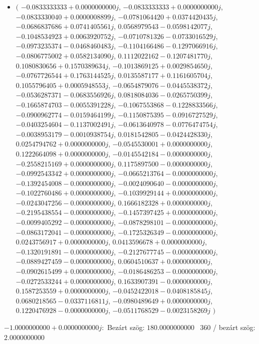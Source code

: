 \documentclass[14pt,a4paper]{article}
\begin{document}
\begin{itemize}
\item
$\big($
$-0.0833333333+0.0000000000j$, $-0.0833333333+0.0000000000j$, $-0.0833330040+0.0000008899j$, $-0.0781064420+0.0374420435j$, $-0.0686837686+0.0741405561j$, $0.0568979543-0.0598142077j$, $-0.1048534923+0.0063920752j$, $-0.0710781326-0.0733016529j$, $-0.0973235374-0.0468460483j$, $-0.1104166486-0.1297066916j$, $-0.0806775002+0.0582134090j$, $0.1112022162-0.1207481770j$, $0.1080830656+0.1570389634j$, $-0.1013869125+0.0029854650j$, $-0.0767726544+0.1763144525j$, $0.0135587177+0.1161605704j$, $0.1055796405+0.0005948553j$, $-0.0654879076-0.0445538372j$, $-0.0536287371-0.0683556926j$, $0.0818084036-0.0265750399j$, $-0.1665874703-0.0055391228j$, $-0.1067553868-0.1228833566j$, $-0.0900962774-0.0159464199j$, $-0.1150875395-0.0916727529j$, $-0.0403254604-0.1137002491j$, $-0.0613640978-0.0776474754j$, $-0.0038953179-0.0010938754j$, $0.0181542805-0.0424428330j$, $0.0254794762+0.0000000000j$, $-0.0545530001+0.0000000000j$, $0.1222664098+0.0000000000j$, $-0.0145542184-0.0000000000j$, $-0.2558215169+0.0000000000j$, $0.1175897500-0.0000000000j$, $-0.0992543342+0.0000000000j$, $-0.0665213764-0.0000000000j$, $-0.1392454008-0.0000000000j$, $-0.0024090640-0.0000000000j$, $-0.1022760486+0.0000000000j$, $-0.1039929144+0.0000000000j$, $-0.0243047256-0.0000000000j$, $0.1666182328+0.0000000000j$, $-0.2195438554-0.0000000000j$, $-0.1457397425+0.0000000000j$, $-0.0099405292-0.0000000000j$, $-0.0878298101-0.0000000000j$, $-0.0863172041-0.0000000000j$, $-0.1725326349-0.0000000000j$, $0.0243756917+0.0000000000j$, $0.0413596678+0.0000000000j$, $-0.1320191891-0.0000000000j$, $-0.2127677745-0.0000000000j$, $-0.0889427459-0.0000000000j$, $0.0604510637+0.0000000000j$, $-0.0902615499+0.0000000000j$, $-0.0186486253-0.0000000000j$, $-0.0272533244+0.0000000000j$, $0.1633907391-0.0000000000j$, $0.1587253559+0.0000000000j$, $-0.0452422018-0.0408185845j$, $0.0680218565-0.0337116811j$, $-0.0980489649+0.0000000000j$, $0.1220476928-0.0000000000j$, $-0.0511768529-0.0023158269j$
$\big)$
\end{itemize}
$-1.0000000000+0.0000000000j$:\
Bezárt szög: $180.0000000000$ \
360 / bezárt szög: $2.0000000000$\
\end{document}
